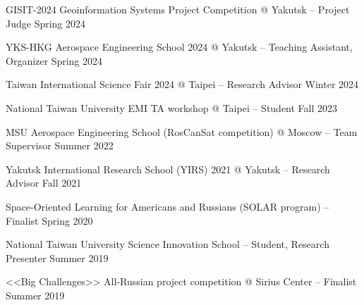 GISIT-2024 Geoinformation Systems Project Competition @ Yakutsk -- Project Judge \hfill Spring 2024

YKS-HKG Aerospace Engineering School 2024 @ Yakutsk -- Teaching Assistant, Organizer \hfill Spring 2024

Taiwan International Science Fair 2024 @ Taipei -- Research Advisor \hfill Winter 2024

National Taiwan University EMI TA workshop @ Taipei -- Student \hfill Fall 2023

MSU Aerospace Engineering School (RosCanSat competition) @ Moscow -- Team Supervisor \hfill Summer 2022

Yakutsk International Research School (YIRS) 2021 @ Yakutsk -- Research Advisor  \hfill Fall 2021
 
Space-Oriented Learning for Americans and Russians (SOLAR program) -- Finalist	\hfill Spring 2020

National Taiwan University Science Innovation School -- Student, Research Presenter	\hfill Summer 2019

<<Big Challenges>> All-Russian project competition @ Sirius Center -- Finalist	\hfill Summer 2019

